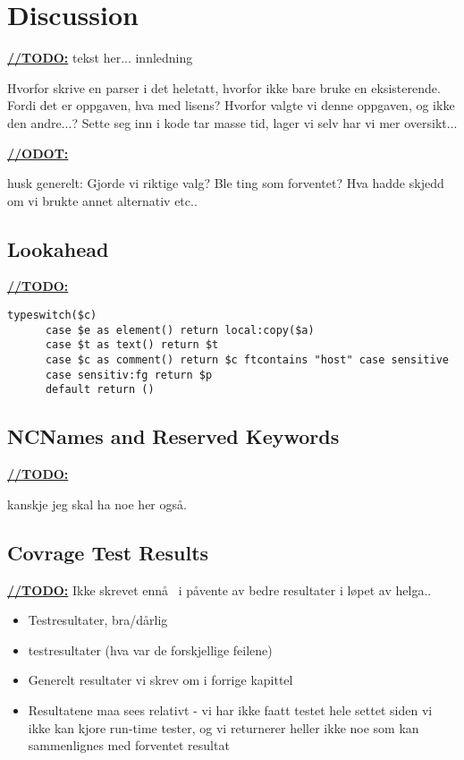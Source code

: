 \chapter{Discussion}
\underline{\textbf{\LARGE //TODO:}} tekst her... innledning

Hvorfor skrive en parser i det heletatt, hvorfor ikke bare bruke en eksisterende. Fordi det er oppgaven, hva med lisens? Hvorfor valgte vi denne oppgaven, og ikke den andre...? Sette seg inn i kode tar masse tid, lager vi selv har vi mer oversikt...

\underline{\textbf{\LARGE //ODOT:}}

husk generelt: Gjorde vi riktige valg? Ble ting som forventet? Hva hadde skjedd om vi brukte annet alternativ etc..

















\section{Lookahead}
\underline{\textbf{\LARGE //TODO:}}
\begin{verbatim}
typeswitch($c) 
      case $e as element() return local:copy($a)
      case $t as text() return $t
      case $c as comment() return $c ftcontains "host" case sensitive
      case sensitiv:fg return $p
      default return ()
\end{verbatim}

\section{NCNames and Reserved Keywords}
\underline{\textbf{\LARGE //TODO:}}

kanskje jeg skal ha noe her ogs\aa .


\section{Covrage Test Results}
\label{sect:discussion:coverageResults}
\underline{\textbf{\LARGE //TODO:}} Ikke skrevet enn\aa~ i p\aa vente av bedre resultater i l\o pet av helga..
\begin{itemize}
\item Testresultater, bra/d\aa rlig
\item testresultater (hva var de forskjellige feilene)
\item Generelt resultater vi skrev om i forrige kapittel
\item Resultatene maa sees relativt - vi har ikke faatt testet hele settet siden
vi ikke kan kjore run-time tester, og vi returnerer heller ikke noe som kan
sammenlignes med forventet resultat
\end{itemize}

